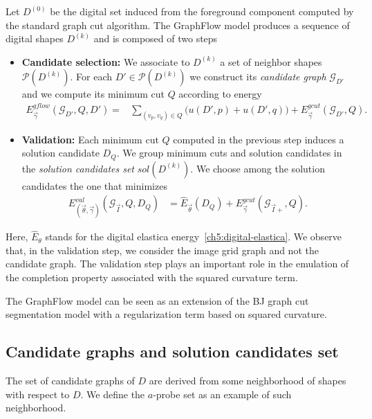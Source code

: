 \documentclass[runningheads]{llncs}
\newcommand{\GG}{ \mathcal{G}_{\vec{I}} }
\newcommand{\GGe}{ \mathcal{G}_{\vec{I}+} }
\begin{document}
Let $D^{(0)}$ be the digital set induced from the foreground component computed by the standard graph cut algorithm.
The GraphFlow model produces a sequence of digital shapes $D^{(k)}$ and is composed of two steps

\begin{itemize}
\item[]{\textbf{Candidate selection:} We associate to $D^{(k)}$ a set of neighbor shapes $\mathcal{P}(D^{(k)})$. For
    each $D' \in \mathcal{P}(D^{(k)})$ we construct its \emph{candidate graph} $\mathcal{G}_{D'}$ and we compute its
    minimum cut $Q$ according to energy
\begin{align}
E^{gflow}_{ \vec{\gamma} }(\mathcal{G}_{D'},Q,D') =& \sum_{ (v_p,v_q) \in Q}{\big(u(D',p) + u(D',q) \big)} + E^{gcut}_{ \vec{\gamma} }(\mathcal{G}_{D'}, Q).
\label{ch8:eq:graphflow-candidate}
\end{align}}

\item[]{\textbf{Validation:} Each minimum cut $Q$ computed in the previous step induces a solution candidate $D_{Q}$. We
    group minimum cuts and solution candidates in the \emph{solution candidates set} $sol(D^{(k)})$. We choose among the
    solution candidates the one that minimizes
\begin{align}
	E^{val}_{ (\vec{\theta},\vec{\gamma}) }(\GG,Q,D_Q) &= \hat{E}_{\vec{\theta} }({D_Q}) + E^{gcut}_{ \vec{\gamma} }(\GGe,Q).
	\label{ch8:eq:graphflow-energy}
\end{align}
}

\end{itemize}
Here, $\hat{E}_\theta$ stands for the digital elastica energy~\eqref{ch5:digital-elastica}. We observe that, in the
validation step, we consider the image grid graph and not the candidate graph. The validation step plays an important
role in the emulation of the completion property associated with the squared curvature term. 

The GraphFlow model can be seen as an extension of the BJ graph cut segmentation model with a regularization term
based on squared curvature.

\subsection{Candidate graphs and solution candidates set}
The set of candidate graphs of $D$ are derived from some neighborhood of shapes with respect to $D$. We define the
$a$-probe set as an example of such neighborhood.
\end{document}
